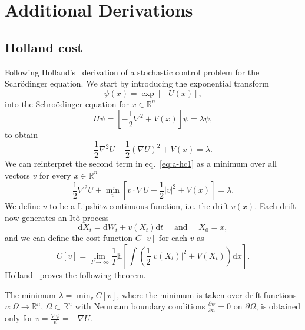 
\chapter{Additional Derivations}

\section{Holland cost}
\label{app:holland-cost}
Following Holland's~\cite{holland1977cost} derivation of a stochastic control problem for the Schr\" odinger equation. We start by introducing the exponential transform
\begin{equation}
	\psi(x)=\exp [-U(x)],
\end{equation}
into the Schro\" odinger equation for $x \in \mathbb{R}^{n}$
\begin{equation}
	H \psi=\left[-\frac{1}{2} \nabla^{2}+V(x)\right] \psi=\lambda \psi,
\end{equation}
to obtain
\begin{equation}
	\label{eq:a-hc1}
	\frac{1}{2} \nabla^{2} U-\frac{1}{2}(\nabla U)^{2}+V(x)=\lambda.
\end{equation}
We can reinterpret the second term in eq.~\eqref{eq:a-hc1} as a minimum over all vectors $v$ for every $x \in \mathbb{R}^{n}$
\begin{equation}
	\label{eq:a-hc2}
	\frac{1}{2} \nabla^{2} U+\min_{v}\left[v \cdot \nabla U+\frac{1}{2}|v|^{2}+V(x)\right]=\lambda.
\end{equation}
We define $v$ to be a Lipshitz continuous function, i.e. the drift $v(x)$. Each drift now generates an It\^ o process
\begin{equation}
	\label{eq:a-hc3}
	\mathrm{d}X_{t}=\mathrm{d}W_{t}+v\left(X_{t}\right) \mathrm{d}t \quad \text{ and } \quad X_0 = x,
\end{equation}
and we can define the cost function $C[v]$ for each $v$ as
\begin{equation}
	\label{eq:a-hc4}
	C[v]=\lim _{T \rightarrow \infty} \frac{1}{T} \mathbb{E}\left[\int \left(\frac{1}{2}\left|v\left(X_{t}\right)\right|^{2}+V\left(X_{t}\right)\right)\mathrm{d}x \right].
\end{equation}
Holland~\cite{holland1977cost} proves the following theorem.
\begin{theorem}
	The minimum $\lambda = \min_{v} C[v]$, where the minimum is taken over drift functions $v: \Omega \rightarrow \mathbb{R}^n$, $\Omega \subset \mathbb{R}^n$ with Neumann boundary conditions $\frac{\partial \psi}{\partial n}=0 \text{ on } \partial \Omega$, is obtained only for $v=\frac{\nabla \psi}{\psi}=-\nabla U$.
\end{theorem}
